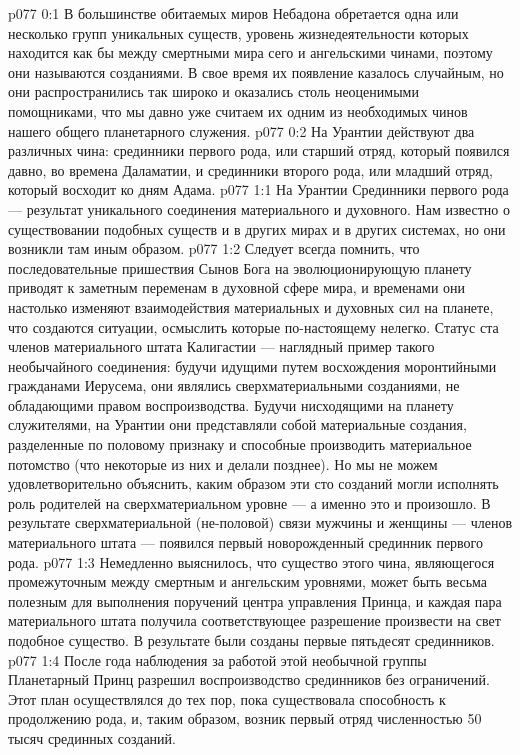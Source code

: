 \vs p077 0:1 В большинстве обитаемых миров Небадона обретается одна или несколько групп уникальных существ, уровень жизнедеятельности которых находится как бы между смертными мира сего и ангельскими чинами, поэтому они называются  созданиями. В свое время их появление казалось случайным, но они распространились так широко и оказались столь неоценимыми помощниками, что мы давно уже считаем их одним из необходимых чинов нашего общего планетарного служения.
\vs p077 0:2 На Урантии действуют два различных чина: срединники первого рода, или старший отряд, который появился давно, во времена Даламатии, и срединники второго рода, или младший отряд, который восходит ко дням Адама.
\vs p077 1:1 На Урантии Срединники первого рода --- результат уникального соединения материального и духовного. Нам известно о существовании подобных существ и в других мирах и в других системах, но они возникли там иным образом.
\vs p077 1:2 Следует всегда помнить, что последовательные пришествия Сынов Бога на эволюционирующую планету приводят к заметным переменам в духовной сфере мира, и временами они настолько изменяют взаимодействия материальных и духовных сил на планете, что создаются ситуации, осмыслить которые по\hyp{}настоящему нелегко. Статус ста членов материального штата Калигастии --- наглядный пример такого необычайного соединения: будучи идущими путем восхождения моронтийными гражданами Иерусема, они являлись сверхматериальными созданиями, не обладающими правом воспроизводства. Будучи нисходящими на планету служителями, на Урантии они представляли собой материальные создания, разделенные по половому признаку и способные производить материальное потомство (что некоторые из них и делали позднее). Но мы не можем удовлетворительно объяснить, каким образом эти сто созданий могли исполнять роль родителей на сверхматериальном уровне --- а именно это и произошло. В результате сверхматериальной (не\hyp{}половой) связи мужчины и женщины --- членов материального штата --- появился первый новорожденный срединник первого рода.
\vs p077 1:3 Немедленно выяснилось, что существо этого чина, являющегося промежуточным между смертным и ангельским уровнями, может быть весьма полезным для выполнения поручений центра управления Принца, и каждая пара материального штата получила соответствующее разрешение произвести на свет подобное существо. В результате были созданы первые пятьдесят срединников.
\vs p077 1:4 После года наблюдения за работой этой необычной группы Планетарный Принц разрешил воспроизводство срединников без ограничений. Этот план осуществлялся до тех пор, пока существовала способность к продолжению рода, и, таким образом, возник первый отряд численностью 50 тысяч срединных созданий.

